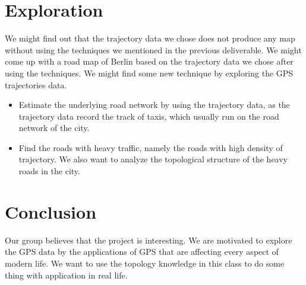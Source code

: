 \documentclass[11pt]{article}
\begin{document}
\section*{Exploration} 
We might find out that the trajectory data we chose does not produce any map without using the techniques we mentioned in the previous deliverable. We might come up with a road map of Berlin based on the trajectory data we chose after using the techniques. We might find some new technique by exploring the GPS trajectories data. 
\begin{itemize}
	\item Estimate the underlying road network  by using the trajectory data, as the trajectory data record the track of taxis, which usually run on the road network of the city.
	
	\item  Find the roads with heavy traffic, namely the roads with high density of trajectory.   We also want to analyze the topological structure of the heavy roads in the city.
\end{itemize}

\section*{Conclusion}
Our group believes that the project is interesting. We are motivated to explore the GPS data by the applications of GPS that are affecting every aspect of modern life. We want to use the topology knowledge in this class to do some thing with application in real life.
\end{document}
